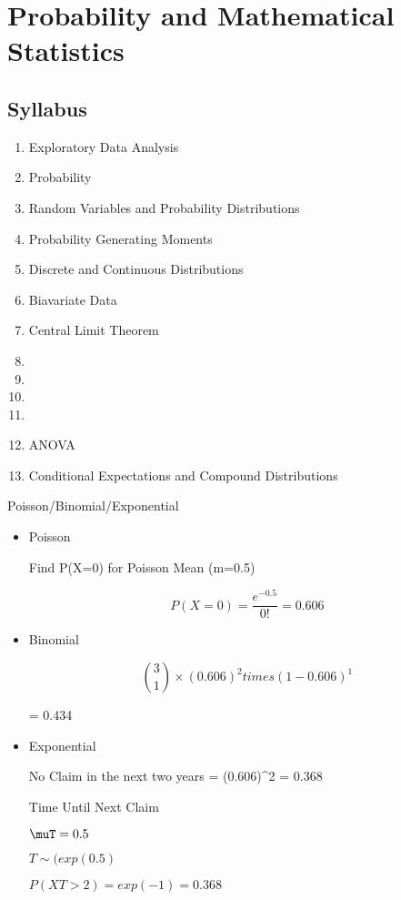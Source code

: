 \section{Probability and Mathematical Statistics}
\subsection*{Syllabus}

\begin{enumerate}	
\item	Exploratory Data Analysis
\item	Probability
\item	Random Variables and Probability Distributions
\item	Probability Generating Moments
\item	Discrete and Continuous Distributions
\item	Biavariate Data
\item	Central Limit Theorem
\item	
\item	
\item	
\item	
\item	ANOVA
\item	Conditional Expectations and Compound Distributions
\end{enumerate}	

Poisson/Binomial/Exponential

\begin{itemize}
\item  Poisson

Find P(X=0) for Poisson Mean (m=0.5)


\[ P(X=0) = \frac{e^{-0.5}}{0!}  = 0.606 \]


\item Binomial

\[ { 3 \choose 1} \times (0.606)^2 times (1-0.606)^1 \]

= 0.434

\item Exponential

No Claim in the next two years
= (0.606)^2 = 0.368

Time Until Next Claim

$\muT = 0.5$

$T \sim (exp(0.5)$

$P(XT >2) = exp(-1) = 0.368$

\end{itemize}

